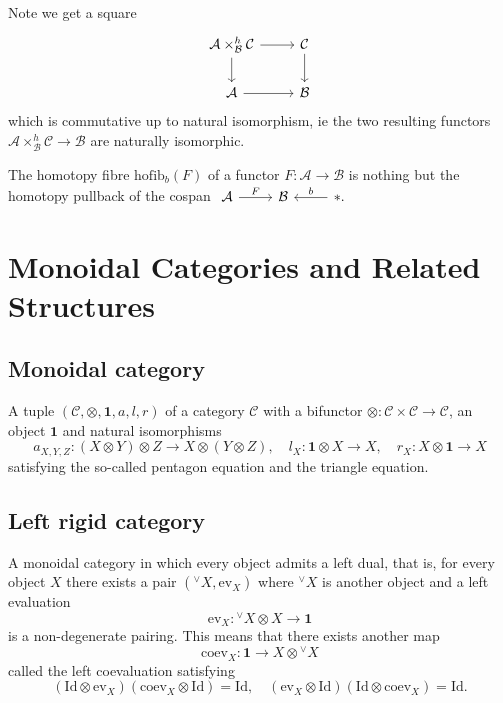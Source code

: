 \documentclass[11pt]{article}
\newcommand{\cat}[1]{\mathcal{#1}}
\theoremstyle{definition}
\begin{document}
Note we get a square
$$
\begin{tikzcd}
    \mathcal{A} \times^h_{\mathcal{B}} \mathcal{C} \rar \dar & \cat{C} \dar \\
    \cat{A} \rar & \cat{B}
\end{tikzcd}
$$
which is commutative up to natural isomorphism, ie the two resulting functors $ \mathcal{A} \times^h_{\mathcal{B}} \mathcal{C} \to \cat{B}$ are naturally isomorphic.


The homotopy fibre $\mathrm{hofib}_b(F)$  of a functor $F: \cat{A}\to \cat{B}$ is nothing but the homotopy pullback of the cospan $\begin{tikzcd}
    \cat{A} \rar{F} & \cat{B} & * \lar[swap]{b}.
\end{tikzcd}$

\section{Monoidal Categories and Related Structures}

\subsection{Monoidal category}
A tuple \( (\mathcal{C}, \otimes, \mathbf{1}, a, l,r) \) of a category \( \mathcal{C} \) with a bifunctor \( \otimes: \mathcal{C} \times \mathcal{C} \to \mathcal{C} \), an object \(\mathbf{1} \) and natural isomorphisms
\[ a_{X,Y,Z}: (X \otimes Y) \otimes Z \to X \otimes(Y \otimes Z), \quad l_X: \mathbf{1} \otimes X \to X, \quad r_X: X \otimes \mathbf{1} \to X 
\]
satisfying the so-called pentagon equation and the triangle equation.

\subsection{Left rigid category}
A monoidal category in which every object admits a left dual, that is, for every object \( X \) there exists a pair \( (^\vee X, \mathrm{ev}_X)\) where \( {}^\vee X\) is another object and a left evaluation
\[ \mathrm{ev}_X :{}^\vee X \otimes X \to  \mathbf{1} \]
is a non-degenerate pairing. This means that there exists another map
\[ \mathrm{coev}_X : \mathbf{1}  \to X \otimes {}^\vee X \]
called the left coevaluation satisfying
\[
(\mathrm{Id} \otimes  \mathrm{ev}_X)(\mathrm{coev}_X \otimes \mathrm{Id} ) = \mathrm{Id}, \quad (\mathrm{ev}_X \otimes \mathrm{Id}  )(\mathrm{Id} \otimes \mathrm{coev}_X  ) = \mathrm{Id}.
\]
\end{document}
